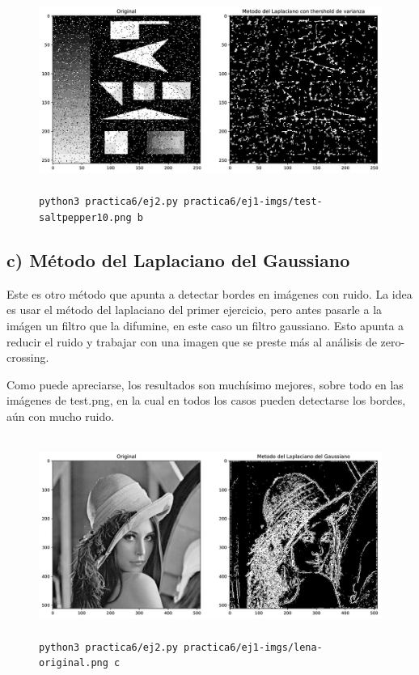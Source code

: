 \documentclass[11pt, spanish]{article}
\begin{document}
\begin{figure}[H]
\centering
    \includegraphics[height=6.5cm]{informe-imgs/ej2-b-test-saltpepper10.jpg}
    \caption{\texttt{python3 practica6/ej2.py practica6/ej1-imgs/test-saltpepper10.png b}}
\end{figure}


\newpage
\subsection{c) Método del Laplaciano del Gaussiano}

Este es otro método que apunta a detectar bordes en imágenes con ruido. La idea es usar el método del laplaciano del primer ejercicio, pero antes pasarle a la imágen un filtro que la difumine, en este caso un filtro gaussiano.
Esto apunta a reducir el ruido y trabajar con una imagen que se preste más al análisis de zero-crossing.

Como puede apreciarse, los resultados son muchísimo mejores, sobre todo en las imágenes de test.png, en la cual en todos los casos pueden detectarse los bordes, aún con mucho ruido.

\begin{figure}[H]
\centering
    \includegraphics[height=6.5cm]{informe-imgs/ej2-c-lena-original.jpg}
    \caption{\texttt{python3 practica6/ej2.py practica6/ej1-imgs/lena-original.png c}}
\end{figure}
\end{document}
